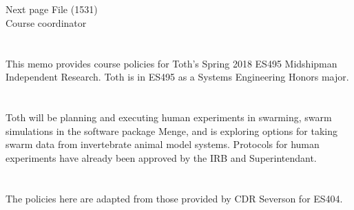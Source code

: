 \documentclass[10pt,courier]{navymemo}
\begin{document}
\noclosing{}\\
\noindent\hspace*{4in}
\signature{D Evangelista}
\noindent\hspace*{4in}{235 Maury Hall}\\

\copyto{}
Next page
\clearpage
\copyto{}
File (1531)\\
Course coordinator


\navyrecordnote
\thispagestyle{empty}


\navyrecordnotesubjline

\section{} This memo provides course policies for Toth's Spring 2018 ES495 Midshipman Independent Research. Toth is in ES495 as a Systems Engineering Honors major.

\section{} Toth will be planning and executing human experiments in swarming, swarm simulations in the software package Menge, and is exploring options for taking swarm data from invertebrate animal model systems. Protocols for human experiments have already been approved by the IRB and Superintendant.

\section{} The policies here are adapted from those provided by CDR Severson for ES404.  
\end{document}
